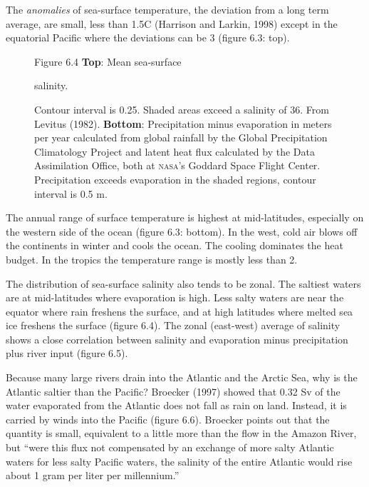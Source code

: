 The \textit{anomalies} of sea-surface
temperature, the deviation from a long term average, are small, less than 1.5\degrees C
(Harrison and Larkin, 1998) except in the equatorial Pacific where the deviations can be
3 (figure 6.3: top).

\begin{figure}[t!]
\footnotesize
Figure 6.4 \textbf{Top}: Mean sea-surface \rule{0pt}{3ex} salinity. \rule{0mm}{2ex}Contour interval is 0.25. Shaded areas exceed a salinity of 36. From Levitus (1982).
\textbf{Bottom}: Precipitation minus evaporation in meters per year calculated from global rainfall by the Global Precipitation Climatology Project and latent heat flux calculated by the Data Assimilation Office, both at \textsc{nasa}'s Goddard Space Flight Center. Precipitation
exceeds evaporation in the shaded regions, contour interval is 0.5 m.

\label{fig:salinity}
\vspace{-3ex}
\end{figure}

The annual range of surface temperature is highest at mid-latitudes,
especially on the western side of the ocean (figure 6.3: bottom). In the west, cold
air blows off the continents in winter and cools the ocean. The cooling dominates
the heat budget. In the tropics the temperature range is mostly less than
2.

The distribution of sea-surface salinity also tends to be zonal. The saltiest waters are at mid-latitudes where evaporation is high. Less salty waters are near the equator where rain freshens the surface, and at high latitudes where melted sea ice freshens the surface (figure 6.4). The zonal (east-west) average of salinity shows a close correlation between salinity and evaporation minus precipitation plus river input (figure 6.5).

Because many large rivers drain into the Atlantic and the Arctic Sea, why is the
Atlantic saltier than the Pacific? Broecker (1997) showed that 0.32 Sv of the
water evaporated from the Atlantic does not fall as rain on land. Instead, it is
carried by winds into the Pacific (figure 6.6). Broecker points out that the
quantity is small, equivalent to a little more than the flow in the Amazon
River, but ``were this flux not compensated by an exchange of more salty
Atlantic waters for less salty Pacific waters, the salinity of the entire
Atlantic would rise about 1 gram per liter per millennium.''

